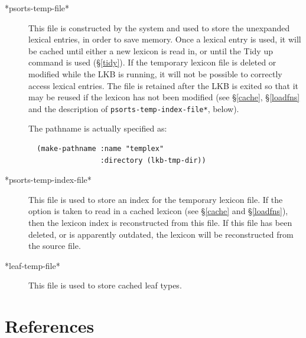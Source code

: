\documentclass[12pt]{report}
\newcommand{\lkbparam}[1]{{\tt #1}}
\newcommand{\lkbmenucommand}{{\bf}}
\begin{document}
\begin{description}
\item[*psorts-temp-file*]
This file is constructed by the system and used to store the unexpanded lexical
entries, in order to save memory.  Once a lexical entry is used, it will
be cached until either a new lexicon is read in, or until the {\lkbmenucommand Tidy up}
command is used (\S\ref{tidy}).  If the temporary
lexicon file is deleted or modified while the LKB is running, it will not
be possible to correctly access lexical entries.  The file is retained
after the LKB is exited so that it may be reused if the lexicon has not been 
modified (see \S\ref{cache}, \S\ref{loadfns} and the description of 
\lkbparam{*psorts-temp-index-file*}, below).

The pathname is actually specified as:
\begin{verbatim}
  (make-pathname :name "templex" 
                 :directory (lkb-tmp-dir))
\end{verbatim}

\item[*psorts-temp-index-file*]
This file is used to store an index for the temporary lexicon file.
If the option is taken to read in a cached lexicon (see \S\ref{cache}
and \S\ref{loadfns}),
then the lexicon index is reconstructed from this file.
If this file has been deleted, or is apparently outdated, the lexicon
will be reconstructed from the source file.
\item[*leaf-temp-file*]
This file is used to store cached leaf types.
\end{description}


\chapter*{References}
\end{document}
